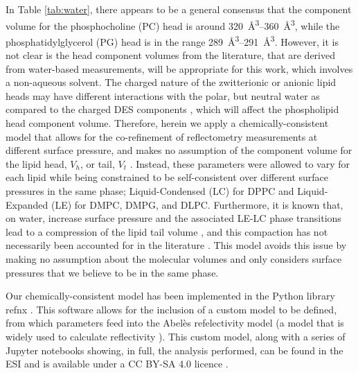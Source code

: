 \documentclass[amsmath,amssymb,twocolumn,superscriptaddress]{revtex4-1}
\begin{document}
In Table \ref{tab:water}, there appears to be a general consensus that the component volume for the phosphocholine (PC) head is around \SIrange{320}{360}{\angstrom\cubed}, while the phosphatidylglycerol (PG) head is in the range \SIrange{289}{291}{\angstrom\cubed}.
However, it is not clear is the head component volumes from the literature, that are derived from water-based measurements, will be appropriate for this work, which involves a non-aqueous solvent.
The charged nature of the zwitterionic or anionic lipid heads may have different interactions with the polar, but neutral water as compared to the charged DES components \cite{Sanchez-Fernandez2018}, which will affect the phospholipid head component volume.
Therefore, herein we apply a chemically-consistent model that allows for the co-refinement of reflectometry measurements at different surface pressure, and makes no assumption of the component volume for the lipid head, $V_h$, or tail, $V_t$ \cite{SI2019}.
Instead, these parameters were allowed to vary for each lipid while being constrained to be self-consistent over different surface pressures in the same phase; Liquid-Condensed (LC) for DPPC and Liquid-Expanded (LE) for DMPC, DMPG, and DLPC.
Furthermore, it is known that, on water, increase surface pressure and the associated LE-LC phase transitions lead to a compression of the lipid tail volume \cite{Marsh2010,Small1984}, and this compaction has not necessarily been accounted for in the literature \cite{Campbell2018}.
This model avoids this issue by making no assumption about the molecular volumes and only considers surface pressures that we believe to be in the same phase.

Our chemically-consistent model has been implemented in the Python library refnx \cite{Nelson2018,Nelson2018a}.
This software allows for the inclusion of a custom model to be defined, from which parameters feed into the Abel\`{e}s refelectivity model (a model that is widely used to calculate reflectivity \cite{Abeles1950,Parratt1954}).
This custom model, along with a series of Jupyter notebooks showing, in full, the analysis performed, can be found in the ESI and is available under a CC BY-SA 4.0 licence \cite{SI2019}.
\end{document}
